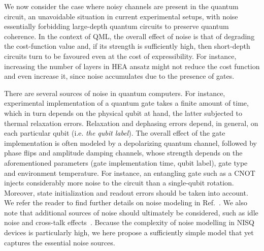 We now consider the case where noisy channels are present in the quantum circuit, an unavoidable situation in current experimental setups, with noise essentially forbidding large-depth quantum circuits to preserve quantum coherence. In the context of QML, the overall effect of noise is that of degrading the cost-function value and, if its strength is sufficiently high, then short-depth circuits turn to be favoured even at the cost of expressibility. For instance, increasing the number of layers in HEA ansatz might not reduce the cost function and even increase it, since noise accumulates due to the presence of gates.

There are several sources of noise in quantum computers. For instance, experimental implementation of a quantum gate takes a finite amount of time, which in turn depends on the physical qubit at hand, the latter subjected to thermal relaxation errors. Relaxation and dephasing errors depend, in general, on each particular qubit (i.e. \textit{the qubit label}). The overall effect of the gate implementation is often modeled by a depolarizing quantum channel, followed by phase flips and amplitude damping channels, whose strength depends on the aforementioned parameters (gate implementation time, qubit label), gate type and environment temperature. For instance, an entangling gate such as a CNOT injects considerably more noise to the circuit than a single-qubit rotation. Moreover, state initialization and readout errors should be taken into account. We refer the reader to find further details on noise modeling in Ref.~\cite{Georgopoulos2021Modeling}. We also note that additional sources of noise should ultimately be considered, such as idle noise and cross-talk effects~\cite{larose2022error, Prakash2020Software}. Because the complexity of noise modelling in NISQ devices is particularly high, we here propose a sufficiently simple model that yet captures the essential noise sources.

